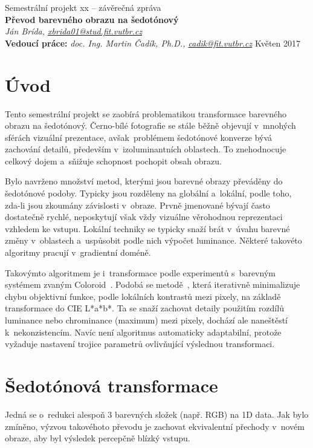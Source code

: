 \documentclass[11pt,a4paper,oneside]{article}
\begin{document}
	\thispagestyle{empty}
	\begin{center}
	\vspace*{60mm}
	{Semestrální projekt xx -- závěrečná zpráva }\\
	\smallskip
	{\Large\bf Převod barevného obrazu na šedotónový}\\
	\smallskip
	{\it Ján Brída, \url{xbrida01@stud.fit.vutbr.cz}}\\
	\vfill
	{\bf Vedoucí práce:} {\it doc. Ing. Martin Čadík, Ph.D., \url{cadik@fit.vutbr.cz}} 
	\hfill {Květen 2017}

	\end{center}
	\newpage

	\section{Úvod}
	Tento semestrální projekt se zaobírá problematikou transformace barevného obrazu
	na šedotónový. Černo-bílé fotografie se stále běžně objevují v~mnohých
	sférách vizuální prezentace, avšak~problémem šedotónové konverze bývá zachování
	detailů, především v~izoluminantních oblastech. To znehodnocuje celkový
	dojem a~sňižuje schopnost pochopit obsah obrazu.

	Bylo navrženo množství metod, kterými jsou barevné obrazy převáděny do šedotónové podoby.
	Typicky jsou rozděleny na globální a~lokální, podle toho, zda-li jsou zkoumány závislosti
	v~obraze. Prvně jmenované bývají často dostatečně rychlé, neposkytují však vždy vizuálne
	věrohodnou reprezentaci vzhledem ke vstupu. Lokální techniky se typicky snaží brát v~úvahu
	barevné změny v~oblastech a~uspůsobit podle nich výpočet luminance. Některé takovéto
	algoritmy pracují v~gradientní doméně.

	Takovýmto algoritmem je i~transformace podle experimentů s~barevným systémem
	zvaným Coloroid~\cite{cadik07color_to_gray, cadik08phd}. Podobá se metodě~\cite{gooch2005color2gray},
	která iterativně minimalizuje chybu objektivní funkce, podle lokálních kontrastů mezi pixely, na základě
	transformace do CIE L*a*b*. Ta se snaží zachovat detaily použitím rozdílů luminance
	nebo chrominance (maximum) mezi pixely, dochází ale naneštěstí k~nekonzistencím.
	Navíc není algoritmus automaticky adaptabilní, protože vyžaduje nastavení
	trojice parametrů ovlivňující výslednou transformaci.

	\section{Šedotónová transformace}
	Jedná se o~redukci alespoň 3 barevných složek (např. RGB) na 1D data.
	Jak bylo zmíněno, výzvou takovéhoto převodu je zachovat ekvivalentní
	přechody v~novém obraze, aby byl výsledek percepčně blízký vstupu.
\end{document}
